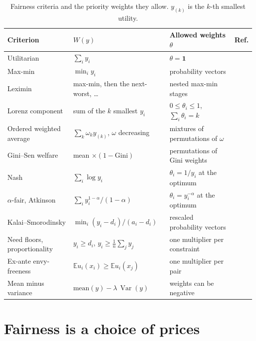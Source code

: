 \documentclass[11pt,a4paper]{article}
\newcommand{\E}{\mathbb{E}}
\newcommand{\one}{\mathbf{1}}
\DeclareMathOperator{\Var}{Var}
\begin{document}
\begin{table}[t]
\centering\footnotesize
\setlength{\tabcolsep}{4pt}
\begin{tabular}{@{}lllc@{}}
\toprule
Criterion & $W(y)$ & Allowed weights $\theta$ & Ref.\\
\midrule
Utilitarian & $\sum_i y_i$ & $\theta=\one$ & \cite{harsanyi1955cardinal}\\
Max-min & $\min_i y_i$ & probability vectors & \cite{rawls1971theory}\\
Leximin & max-min, then the next-worst, \dots & nested max-min stages & \cite{daspremont1977equity}\\
Lorenz component & sum of the $k$ smallest $y_i$ & $0\le\theta_i\le1$, $\sum_i\theta_i=k$ & \cite{shorrocks1983ranking}\\
Ordered weighted average & $\sum_k\omega_k y_{(k)}$, $\omega$ decreasing & mixtures of permutations of $\omega$ & \cite{yager1988ordered}\\
Gini--Sen welfare & mean $\times(1-\text{Gini})$ & permutations of Gini weights & \cite{sen1973economic,weymark1981generalized}\\
Nash & $\sum_i\log y_i$ & $\theta_i=1/y_i$ at the optimum & \cite{nash1950bargaining,kaneko1979nash}\\
$\alpha$-fair, Atkinson & $\sum_i y_i^{1-\alpha}/(1-\alpha)$ & $\theta_i=y_i^{-\alpha}$ at the optimum & \cite{atkinson1970measurement,mo2000fair}\\
Kalai--Smorodinsky & $\min_i(y_i-d_i)/(a_i-d_i)$ & rescaled probability vectors & \cite{kalai1975other}\\
Need floors, proportionality & $y_i\ge d_i$, $y_i\ge\frac1n\sum_jy_j$ & one multiplier per constraint & \cite{steinhaus1948problem}\\
Ex-ante envy-freeness & $\E u_i(x_i)\ge\E u_i(x_j)$ & one multiplier per pair & \cite{foley1967resource,varian1974equity}\\
Mean minus variance & $\mathrm{mean}(y)-\lambda\,\Var(y)$ & weights can be negative & \cite{markowitz1952portfolio}\\
\bottomrule
\end{tabular}
\caption{Fairness criteria and the priority weights they allow. $y_{(k)}$ is the $k$-th smallest
utility.}
\label{tab:criteria}
\end{table}

\section{Fairness is a choice of prices}\label{sec:prices}
\end{document}
